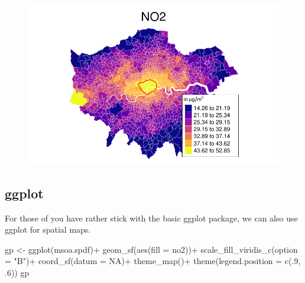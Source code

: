 \documentclass[
  letterpaper,
  DIV=11,
  numbers=noendperiod]{scrreprt}
\newenvironment{Shaded}{\begin{snugshade}}{\end{snugshade}}
\newcommand{\AttributeTok}[1]{\textcolor[rgb]{0.40,0.45,0.13}{#1}}
\newcommand{\ConstantTok}[1]{\textcolor[rgb]{0.56,0.35,0.01}{#1}}
\newcommand{\DecValTok}[1]{\textcolor[rgb]{0.68,0.00,0.00}{#1}}
\newcommand{\FunctionTok}[1]{\textcolor[rgb]{0.28,0.35,0.67}{#1}}
\newcommand{\NormalTok}[1]{\textcolor[rgb]{0.00,0.23,0.31}{#1}}
\newcommand{\OtherTok}[1]{\textcolor[rgb]{0.00,0.23,0.31}{#1}}
\newcommand{\SpecialCharTok}[1]{\textcolor[rgb]{0.37,0.37,0.37}{#1}}
\newcommand{\StringTok}[1]{\textcolor[rgb]{0.13,0.47,0.30}{#1}}
\begin{document}
\begin{figure}[H]

{\centering \includegraphics{01_refresher_short_files/figure-pdf/unnamed-chunk-34-1.pdf}

}

\end{figure}

\hypertarget{ggplot}{%
\subsection{ggplot}\label{ggplot}}

For those of you have rather stick with the basic ggplot package, we can
also use ggplot for spatial maps.

\begin{Shaded}
\begin{Highlighting}[]
\NormalTok{gp }\OtherTok{\textless{}{-}} \FunctionTok{ggplot}\NormalTok{(msoa.spdf)}\SpecialCharTok{+}
    \FunctionTok{geom\_sf}\NormalTok{(}\FunctionTok{aes}\NormalTok{(}\AttributeTok{fill =}\NormalTok{ no2))}\SpecialCharTok{+}
    \FunctionTok{scale\_fill\_viridis\_c}\NormalTok{(}\AttributeTok{option =} \StringTok{"B"}\NormalTok{)}\SpecialCharTok{+}
    \FunctionTok{coord\_sf}\NormalTok{(}\AttributeTok{datum =} \ConstantTok{NA}\NormalTok{)}\SpecialCharTok{+}
    \FunctionTok{theme\_map}\NormalTok{()}\SpecialCharTok{+}
    \FunctionTok{theme}\NormalTok{(}\AttributeTok{legend.position =} \FunctionTok{c}\NormalTok{(.}\DecValTok{9}\NormalTok{, .}\DecValTok{6}\NormalTok{))}
\NormalTok{gp}
\end{Highlighting}
\end{Shaded}
\end{document}
